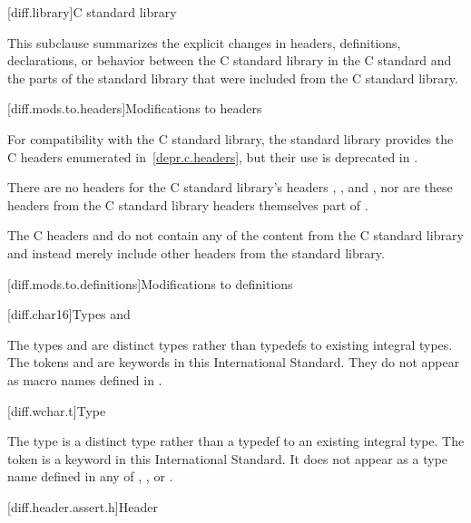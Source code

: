 [diff.library]{C standard library}
%

\pnum
This subclause summarizes the explicit changes in headers,
definitions, declarations, or behavior between the C standard library
in the C standard and the parts of the \Cpp{} standard library that were
included from the C standard library.

[diff.mods.to.headers]{Modifications to headers}

\pnum
For compatibility with the C standard library,
the \Cpp{} standard library provides the C headers enumerated
in~\ref{depr.c.headers}, but their use is deprecated in \Cpp{}.

\pnum
There are no \Cpp{} headers for the C standard library's headers
,
,
and ,
nor are these headers from the C standard library headers themselves part of \Cpp{}.

\pnum
The C headers  and
 do not contain any of the content from
the C standard library and instead merely include other headers from the \Cpp{}
standard library.

[diff.mods.to.definitions]{Modifications to definitions}

[diff.char16]{Types  and }

\pnum
The types  and 
are distinct types rather than typedefs to existing integral types.
The tokens  and 
are keywords in this International Standard.
They do not appear as macro names defined in
.

[diff.wchar.t]{Type }

\pnum
The type  is a distinct type rather than a typedef to an
existing integral type.
The token 
is a keyword in this International Standard.
It does not appear as a type name defined in any of
,
,
or .

[diff.header.assert.h]{Header }
%

